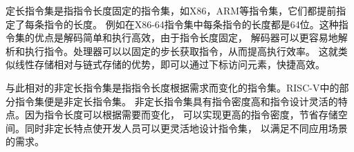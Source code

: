 \documentclass[UTF8]{ctexart}
\begin{document}
定长指令集是指指令长度固定的指令集，如X86，ARM等指令集，它们都提前指定了每条指令的长度。
例如在X86-64指令集中每条指令的长度都是64位。这种指令集的优点是解码简单和执行高效，由于指令长度固定，
解码器可以更容易地解析和执行指令。处理器可以以固定的步长获取指令，从而提高执行效率。
这就类似线性存储相对与链式存储的优势，即可以通过下标访问元素，快捷高效。

与此相对的非定长指令集是指指令长度根据需求而变化的指令集。RISC-V中的部分指令集便是非定长指令集。
非定长指令集具有指令密度高和指令设计灵活的特点。因为指令长度可以根据需要而变化，
可以实现更高的指令密度，节省存储空间。同时非定长特点使开发人员可以更灵活地设计指令集，
以满足不同应用场景的需求。
\end{document}
